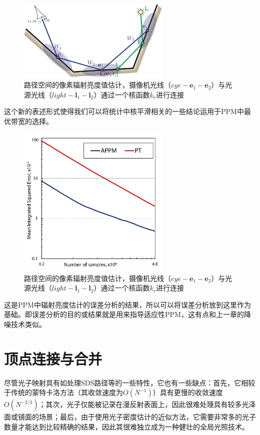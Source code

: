 \begin{figure}
	\sidecaption
	\includegraphics[width=0.65\textwidth]{figures/pm/path-space-estimation}
	\caption{路径空间的像素辐射亮度值估计，摄像机光线（$eye-\mathbf{e}_1-\mathbf{e}_2$）与光源光线（$light-\mathbf{l}_1-\mathbf{l}_2$）通过一个核函数$k_r$进行连接}
	\label{f:pm-path-space}
\end{figure}

这个新的表述形式使得我们可以将统计中核平滑相关的一些结论运用于PPM中最优带宽的选择。


\begin{figure}
	\sidecaption
	\includegraphics[width=0.65\textwidth]{figures/pm/pppm-error}
	\caption{路径空间的像素辐射亮度值估计，摄像机光线（$eye-\mathbf{e}_1-\mathbf{e}_2$）与光源光线（$light-\mathbf{l}_1-\mathbf{l}_2$）通过一个核函数$k_r$进行连接}
	\label{f:pm-pppm-error}
\end{figure}

这是PPM中辐射亮度估计的误差分析的结果，所以可以将误差分析放到这里作为基础。即误差分析的目的或结果就是用来指导适应性PPM，这有点和上一章的降噪技术类似。


\section{顶点连接与合并}\label{sec:pm-vcm}
尽管光子映射具有如处理SDS路径等的一些特性，它也有一些缺点：首先，它相较于传统的蒙特卡洛方法（其收敛速度为$O(N^{-1})$）具有更慢的收敛速度$O(N^{-2/3})$；其次，光子仅能被记录在漫反射表面上，因此很难处理具有较多光泽面或镜面的场景；最后，由于使用光子密度估计的近似方法，它需要非常多的光子数量才能达到比较精确的结果，因此其很难独立成为一种健壮的全局光照技术。

